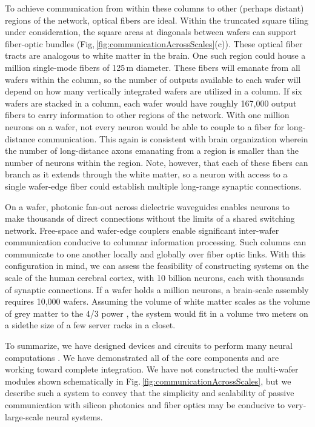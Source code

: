 \documentclass[twocolumn]{article}
\begin{document}
To achieve communication from within these columns to other (perhaps distant) regions of the network, optical fibers are ideal. Within the truncated square tiling under consideration, the square areas at diagonals between wafers can support fiber-optic bundles (Fig,\,\ref{fig:communicationAcrossScales}(c)). These optical fiber tracts are analogous to white matter in the brain. One such region could house a million single-mode fibers of 125\,\textmu m diameter. These fibers will emanate from all wafers within the column, so the number of outputs available to each wafer will depend on how many vertically integrated wafers are utilized in a column. If six wafers are stacked in a column, each wafer would have roughly 167,000 output fibers to carry information to other regions of the network. With one million neurons on a wafer, not every neuron would be able to couple to a fiber for long-distance communication. This again is consistent with brain organization wherein the number of long-distance axons emanating from a region is smaller than the number of neurons within the region. Note, however, that each of these fibers can branch as it extends through the white matter, so a neuron with access to a single wafer-edge fiber could establish multiple long-range synaptic connections. 

On a wafer, photonic fan-out across dielectric waveguides enables neurons to make thousands of direct connections without the limits of a shared switching network. Free-space and wafer-edge couplers enable significant inter-wafer communication conducive to columnar information processing. Such columns can communicate to one another locally and globally over fiber optic links. With this configuration in mind, we can assess the feasibility of constructing systems on the scale of the human cerebral cortex, with 10 billion neurons, each with thousands of synaptic connections. If a wafer holds a million neurons, a brain-scale assembly requires 10,000 wafers. Assuming the volume of white matter scales as the volume of grey matter to the 4/3 power \cite{zhse2000}, the system would fit in a volume two meters on a side\textemdash the size of a few server racks in a closet. 

To summarize, we have designed devices and circuits to perform many neural computations \cite{sh2018,sh2018_full}. We have demonstrated all of the core components and are working toward complete integration. We have not constructed the multi-wafer modules shown schematically in Fig.\,\ref{fig:communicationAcrossScales}, but we describe such a system to convey that the simplicity and scalability of passive communication with silicon photonics and fiber optics may be conducive to very-large-scale neural systems. 
\end{document}
